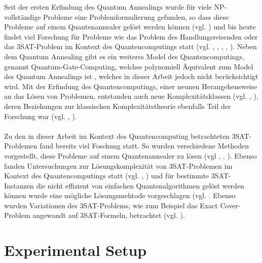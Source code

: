 \documentclass[runningheads]{llncs}
\begin{document}
Seit der ersten Erfindung des Quantum Annealings wurde für viele NP-vollständige Probleme eine Problemformulierung gefunden, so dass diese Probleme auf einem Quantenannealer gelöst werden können (vgl. \cite{lucas2014ising}) und bis heute findet viel Forschung für Probleme wie das Problem des Handlungsreisenden oder das 3SAT-Problem im Kontext des Quantencomputings statt (vgl. \cite{heim2017designing}, \cite{warren2017small}, \cite{moylett2017quantum}, \cite{strand2017zzz}, \cite{benjamin2017measurement}). Neben dem Quantum Annealing gibt es ein weiteres Model des Quantencomputings, genannt Quantum-Gate-Computing, welches polynomiell Äquivalent zum Model des Quantum Annealings ist \cite{mcgeoch2014adiabatic}, welches in dieser Arbeit jedoch nicht berücksichtigt wird. Mit der Erfindung des Quantencomputings, einer neunen Herangehensweise an das Lösen von Problemen, entstanden auch neue Komplexitätsklassen (vgl. \cite{klauck2017complexity}, \cite{morimae2017merlinization}), deren Beziehungen zur klassischen Komplexitätstheorie ebenfalls Teil der Forschung war (vgl. \cite{bernstein1997quantum}, \cite{marriott2005quantum}).\\\\Zu den in dieser Arbeit im Kontext des Quantencomputing betrachteten 3SAT-Problemen fand bereits viel Foschung statt. So wurden verschiedene Methoden vorgestellt, diese Probleme auf einem Quantenannealer zu lösen (vgl \cite{choi2011different}, \cite{choi2010adiabatic}, \cite{farhi2000quantum}). Ebenso fanden Untersuchungen zur Lösungskomplexität von 3SAT-Problemen im Kontext des Quantencomputings statt (vgl. \cite{van2001powerful}, \cite{farhi2000numerical}) und für bestimmte 3SAT-Instanzen die nicht effizient von einfachen Quantenalgorithmen gelöst werden können wurde eine mögliche Lösungsmehtode vorgeschlagen (vgl. \cite{farhi2009quantum}. Ebenso wurden Variationen des 3SAT-Problems, wie zum Beispiel das Exact Cover-Problem angewandt auf 3SAT-Formeln, betrachtet (vgl. \cite{farhi2001quantum}).

\section{Experimental Setup}
\end{document}
